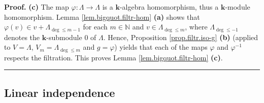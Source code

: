 \documentclass[numbers=enddot,12pt,final,onecolumn,notitlepage]{scrartcl}%
\theoremstyle{definition}
\newenvironment{proof}[1][Proof]{\noindent\textbf{#1.} }{\ \rule{0.5em}{0.5em}}
\begin{document}
\begin{proof}
\textbf{(c)} The map $\varphi:\Lambda\rightarrow\Lambda$ is a $\mathbf{k}%
$-algebra homomorphism, thus a $\mathbf{k}$-module homomorphism. Lemma
\ref{lem.bigquot.filtr-hom} \textbf{(a)} shows that $\varphi\left(  v\right)
\in v+\Lambda_{\deg\leq m-1}$ for each $m\in\mathbb{N}$ and $v\in\Lambda
_{\deg\leq m}$, where $\Lambda_{\deg\leq-1}$ denotes the $\mathbf{k}%
$-submodule $0$ of $\Lambda$. Hence, Proposition \ref{prop.filtr.iso-g}
\textbf{(b)} (applied to $V=\Lambda$, $V_{m}=\Lambda_{\deg\leq m}$ and
$g=\varphi$) yields that each of the maps $\varphi$ and $\varphi^{-1}$
respects the filtration. This proves Lemma \ref{lem.bigquot.filtr-hom}
\textbf{(c)}.
\end{proof}

\subsection{Linear independence}
\end{document}
